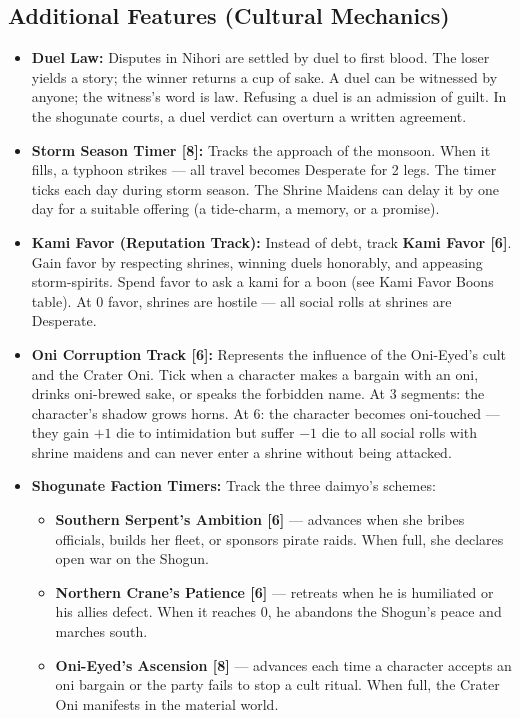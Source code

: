 \subsection*{Additional Features (Cultural Mechanics)}
\label{sec:nihori-features}

\begin{itemize}
\item \textbf{Duel Law:} Disputes in Nihori are settled by duel to first blood. The loser yields a story; the winner returns a cup of sake. A duel can be witnessed by anyone; the witness's word is law. Refusing a duel is an admission of guilt. In the shogunate courts, a duel verdict can overturn a written agreement.
\item \textbf{Storm Season Timer [8]:} Tracks the approach of the monsoon. When it fills, a typhoon strikes --- all travel becomes Desperate for 2 legs. The timer ticks each day during storm season. The Shrine Maidens can delay it by one day for a suitable offering (a tide-charm, a memory, or a promise).
\item \textbf{Kami Favor (Reputation Track):} Instead of debt, track \textbf{Kami Favor [6]}. Gain favor by respecting shrines, winning duels honorably, and appeasing storm-spirits. Spend favor to ask a kami for a boon (see Kami Favor Boons table). At 0 favor, shrines are hostile --- all social rolls at shrines are Desperate.
\item \textbf{Oni Corruption Track [6]:} Represents the influence of the Oni-Eyed's cult and the Crater Oni. Tick when a character makes a bargain with an oni, drinks oni-brewed sake, or speaks the forbidden name. At 3 segments: the character's shadow grows horns. At 6: the character becomes oni-touched --- they gain $+1$ die to intimidation but suffer $-1$ die to all social rolls with shrine maidens and can never enter a shrine without being attacked.
\item \textbf{Shogunate Faction Timers:} Track the three daimyo's schemes:
  \begin{itemize}
    \item \textbf{Southern Serpent's Ambition [6]} --- advances when she bribes officials, builds her fleet, or sponsors pirate raids. When full, she declares open war on the Shogun.
    \item \textbf{Northern Crane's Patience [6]} --- retreats when he is humiliated or his allies defect. When it reaches 0, he abandons the Shogun's peace and marches south.
    \item \textbf{Oni-Eyed's Ascension [8]} --- advances each time a character accepts an oni bargain or the party fails to stop a cult ritual. When full, the Crater Oni manifests in the material world.

\end{itemize}
\end{itemize}
